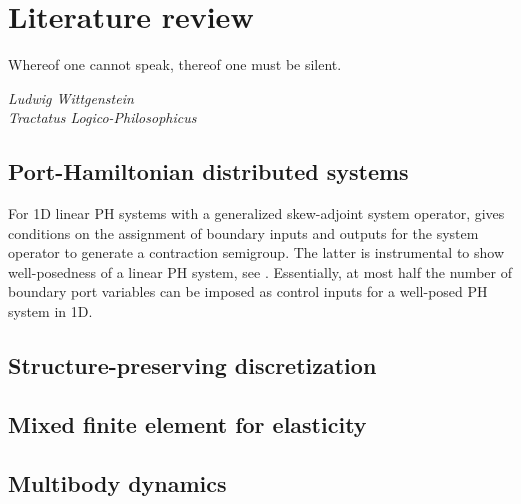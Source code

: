 \chapter[Literature review]{Literature review}

\epigraph{Whereof one cannot speak, thereof one must be silent.}{\textit{ Ludwig Wittgenstein \\ Tractatus Logico-Philosophicus}}

\section{Port-Hamiltonian distributed systems}

 For 1D linear PH systems with a generalized skew-adjoint system operator, \cite{legorrec2005} gives conditions on the assignment of boundary inputs and outputs for the system operator to generate a contraction
semigroup. The latter is instrumental to show well-posedness of a linear PH
system, see \cite{zwart2012}. Essentially, at most half the number of boundary port variables
can be imposed as control inputs for a well-posed PH system in 1D.

\section{Structure-preserving discretization}

\section{Mixed finite element for elasticity}

\section{Multibody dynamics}